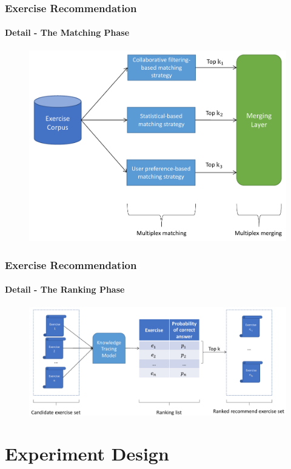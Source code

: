\documentclass{beamer}
\begin{document}
\begin{frame}
  \frametitle{Exercise Recommendation}
  \framesubtitle{Detail - The Matching Phase}
  \begin{figure}
    \centering
    \includegraphics[height=0.7\textheight]{figures/ch4-matching-model.pdf}
  \end{figure}
\end{frame}

\begin{frame}
  \frametitle{Exercise Recommendation}
  \framesubtitle{Detail - The Ranking Phase}
  \begin{figure}
    \centering
    \includegraphics[width=1.0\textwidth]{figures/ch4-ranking-model.pdf}
  \end{figure}
\end{frame}

\section{Experiment Design}
\end{document}
